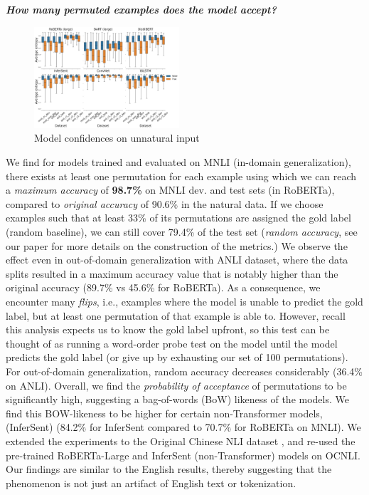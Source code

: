 \documentclass[12pt]{article}
\newcommand{\xit}[1]{{\noindent\textbf{\textit{#1}}}}
\begin{document}
\xit{How many permuted examples does the model accept?}

\begin{figure}
\begin{center}
  \includegraphics[width=0.48\textwidth]{images/unli_entropy_plot.png}
\end{center}
\caption{Model confidences on unnatural input}
\label{fig:all_entropy}
\end{figure}


We find for models trained and evaluated on MNLI (in-domain generalization), there exists at least one permutation for each example using which we can reach a \textit{maximum accuracy} of \textbf{98.7\%} on MNLI dev. and test sets (in RoBERTa), compared to \textit{original accuracy} of 90.6\% in the natural data. If we choose examples such that at least 33\% of its permutations are assigned the gold label (random baseline), we can still cover 79.4\% of the test set (\textit{random accuracy}, see our paper \cite{sinha2021a} for more details on the construction of the metrics.)
We observe the effect even in out-of-domain generalization with ANLI dataset, where the data splits resulted in a maximum accuracy value that is notably higher than the original accuracy (89.7\% vs 45.6\% for RoBERTa). As a consequence, we encounter many \textit{flips}, i.e., examples where the model is unable to predict the gold label, but at least one permutation of that example is able to. However, recall this analysis expects us to know the gold label upfront, so this test can be thought of as running a word-order probe test on the model until the model predicts the gold label (or give up by exhausting our set of 100 permutations). For out-of-domain generalization, random accuracy decreases considerably (36.4\% on ANLI). Overall, we find the \textit{probability of acceptance} of permutations to be significantly high, suggesting a bag-of-words (BoW) likeness of the models. We find this BOW-likeness to be higher for certain non-Transformer models, (InferSent) (84.2\% for InferSent compared to 70.7\% for RoBERTa on MNLI). We extended the experiments to the Original Chinese NLI dataset \citep[OCNLI]{hu-etal-2020-ocnli}, and re-used the pre-trained RoBERTa-Large and InferSent (non-Transformer) models on OCNLI. Our findings are similar to the English results, thereby suggesting that the phenomenon is not just an artifact of English text or tokenization.
\end{document}
